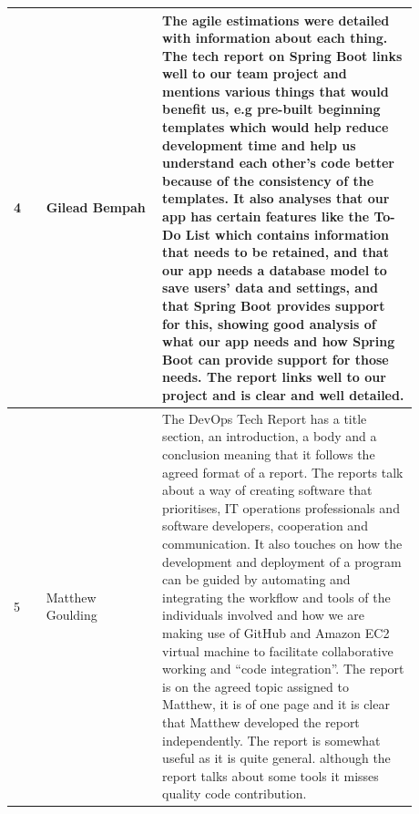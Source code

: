 \documentclass[a4paper]{article}
\begin{document}
{\noindent\begin{tabular}{|p{0.075\linewidth}|p{0.25\linewidth}|p{0.55\linewidth}|} 
\hline
 4 & Gilead Bempah& The agile estimations were detailed with information about each thing. The tech report on Spring Boot links well to our team project and mentions various things that would benefit us, e.g pre-built beginning templates which would help reduce development time and help us understand each other's code better because of the consistency of the templates. It also analyses that our app has certain features like the To-Do List which contains information that needs to be retained, and that our app needs a database model to save users' data and settings, and that Spring Boot provides support for this, showing good analysis of what our app needs and how Spring Boot can provide support for those needs. The report links well to our project and is clear and well detailed. \\
 \hline
 5 & Matthew Goulding& The DevOps Tech Report has a title section, an introduction, a body and a conclusion meaning that it follows the agreed format of a report. The reports talk about a way of creating software that prioritises, IT operations professionals and software developers, cooperation and communication. It also touches on how the development and deployment of a program can be guided by automating and integrating the workflow and tools of the individuals involved and how we are making use of GitHub and Amazon EC2 virtual machine to facilitate collaborative working and “code integration”. The report is on the agreed topic assigned to Matthew, it is of one page and it is clear that Matthew developed the report independently. The report is somewhat useful as it is quite general. although the report talks about some tools it misses quality code contribution.\\
 \hline
\end{tabular}}
\end{document}

